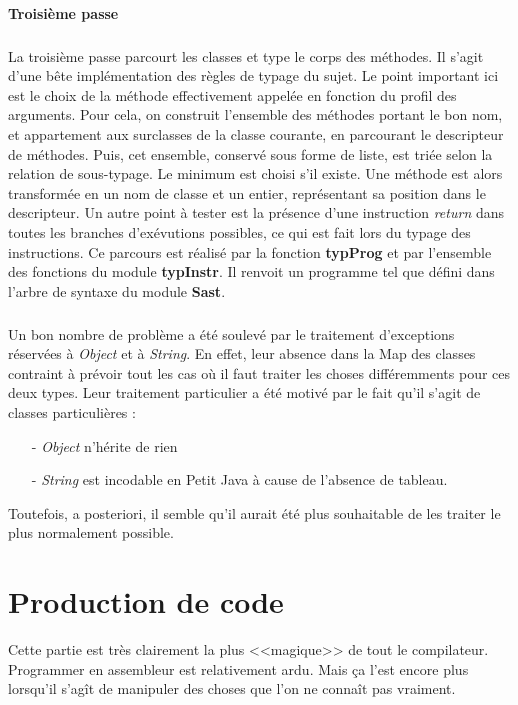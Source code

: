 \documentclass{article}
\begin{document}
\paragraph{Troisième passe}
\subparagraph*{}
La troisième passe parcourt les classes et type le corps des méthodes. Il s'agit d'une bête implémentation des règles de typage du sujet. Le point important ici est le choix de la méthode effectivement appelée en fonction du profil des arguments. Pour cela, on construit l'ensemble des méthodes portant le bon nom, et appartement aux surclasses de la classe courante, en parcourant le descripteur de méthodes. Puis, cet ensemble, conservé sous forme de liste, est triée selon la relation de sous-typage. Le minimum est choisi s'il existe. Une méthode est alors transformée en un nom de classe et un entier, représentant sa position dans le descripteur. Un autre point à tester est la présence d'une instruction \emph{return} dans toutes les branches d'exévutions possibles, ce qui est fait lors du typage des instructions. Ce parcours est réalisé par la fonction \textbf{typProg} et par l'ensemble des fonctions du module \textbf{typInstr}. Il renvoit un programme tel que défini dans l'arbre de syntaxe du module \textbf{Sast}.

\subparagraph*{} Un bon nombre de problème a été soulevé par le traitement d'exceptions réservées à \emph{Object} et à \emph{String}. En effet, leur absence dans la Map des classes contraint à prévoir tout les cas où il faut traiter les choses différemments pour ces deux types. Leur traitement particulier a été motivé par le fait qu'il s'agit de classes particulières : 
\begin{itemize}
\item[-] \emph{Object} n'hérite de rien
\item[-] \emph{String} est incodable en Petit Java à cause de l'absence de tableau.
\end{itemize}
Toutefois, a posteriori, il semble qu'il aurait été plus souhaitable de les traiter le plus normalement possible. 

\section{Production de code}

Cette partie est très clairement la plus <<magique>> de tout le
compilateur. Programmer en assembleur est relativement ardu. Mais ça l'est
encore plus lorsqu'il s'agît de manipuler des choses que l'on ne connaît
pas vraiment.
\end{document}
